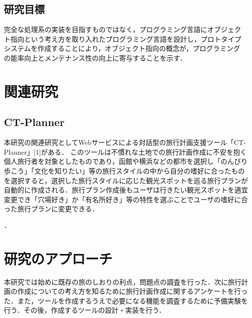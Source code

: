 \documentclass{funthesis}
\begin{document}
\section{研究目標}

完全な処理系の実装を目指すものではなく，プログラミング言語にオブジェク
ト指向という考え方を取り入れたプログラミング言語を設計し，プロトタイプ
システムを作成することにより，オブジェクト指向の概念が，プログラミング
の能率向上とメンテナンス性の向上に寄与することを示す．

\chapter{関連研究}%

\section{CT-Planner}


本研究の関連研究としてWebサービスによる対話型の旅行計画支援ツール「CT-Planner」[1]がある．
このツールは不慣れな土地での旅行計画作成に不安を抱く個人旅行者を対象としたものであり，函館や横浜などの都市を選択し「のんびり歩こう」「文化を知りたい」等の旅行スタイルの中から自分の嗜好に合ったものを選択すると，選択した旅行スタイルに応じた観光スポットを巡る旅行プランが自動的に作成される．旅行プラン作成後もユーザは行きたい観光スポットを適宜変更でき「穴場好き」か「有名所好き」等の特性を選ぶことでユーザの嗜好に合った旅行プランに変更できる．


．


\chapter{研究のアプローチ}%

本研究では始めに既存の旅のしおりの利点，問題点の調査を行った．次に旅行計画の作成についての考え方を知るために旅行計画作成に関するアンケートを行った．また，ツールを作成するうえで必要になる機能を調査するために予備実験を行う．その後，作成するツールの設計・実装を行う．
\end{document}
